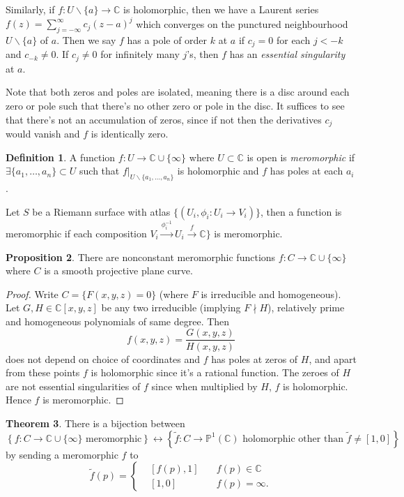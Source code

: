 \documentclass{article}
\newcommand{\C}{\mathbb{C}}
\newcommand{\p}{\mathbb{P}}
\theoremstyle{definition}
\newtheorem{defn}{Definition}[subsection]
\newtheorem{prop}[defn]{Proposition}
\newtheorem{thm}[defn]{Theorem}
\begin{document}
Similarly, if $f:U\backslash\{a\}\rightarrow\C$ is holomorphic, then we have a Laurent series $f(z)=\sum_{j=-\infty}^\infty c_j(z-a)^j$ which converges on the punctured neighbourhood $U\backslash\{a\}$ of $a$. Then we say $f$ has a pole of order $k$ at $a$ if $c_j=0$ for each $j<-k$ and $c_{-k}\neq 0$. If $c_j\neq 0$ for infinitely many $j$'s, then $f$ has an \textit{essential singularity} at $a$.

Note that both zeros and poles are isolated, meaning there is a disc around each zero or pole such that there's no other zero or pole in the disc. It suffices to see that there's not an accumulation of zeros, since if not then the derivatives $c_j$ would vanish and $f$ is identically zero.

\begin{defn}
A function $f:U\rightarrow\C\cup\{\infty\}$ where $U\subset\C$ is open is \textit{meromorphic} if $\exists\{a_1,\ldots,a_n\}\subset U$ such that $\left. f\right|_{U\backslash\{a_1,\ldots,a_n\}}$ is holomorphic and $f$ has poles at each $a_i$.

Let $S$ be a Riemann surface with atlas $\{(U_i,\phi_i:U_i\rightarrow V_i)\}$, then a function is meromorphic if each composition $V_i\xrightarrow{\phi_i^{-1}}U_i\xrightarrow{f}\C\}$ is meromorphic.
\end{defn}

\begin{prop}
\label{prop:nonconstmeromorphic}
There are nonconstant meromorphic functions $f:C\rightarrow\C\cup\{\infty\}$ where $C$ is a smooth projective plane curve.
\end{prop}
\begin{proof}
Write $C=\{F(x,y,z)=0\}$ (where $F$ is irreducible and homogeneous). Let $G,H\in\C[x,y,z]$ be any two irreducible (implying $F\nmid H$), relatively prime and homogeneous polynomials of same degree. Then
\[
f(x,y,z)=\frac{G(x,y,z)}{H(x,y,z)}
\]
does not depend on choice of coordinates and $f$ has poles at zeros of $H$, and apart from these points $f$ is holomorphic since it's a rational function. The zeroes of $H$ are not essential singularities of $f$ since when multiplied by $H$, $f$ is holomorphic. Hence $f$ is meromorphic.
\end{proof}

\begin{thm}
There is a bijection between
\[
\left\{f:C\rightarrow\C\cup\{\infty\}\text{ meromorphic}\right\}\leftrightarrow\left\{\widetilde f:C\rightarrow\p^1(\C)\text{ holomorphic other than }\widetilde f\neq [1,0]\right\}
\]
by sending a meromorphic $f$ to
\[
\widetilde f(p)=\left\{
\begin{aligned}
&[f(p),1]\quad &f(p)\in\C \\
&[1,0]\quad &f(p)=\infty .
\end{aligned}
\right.
\]
\end{thm}
\end{document}
